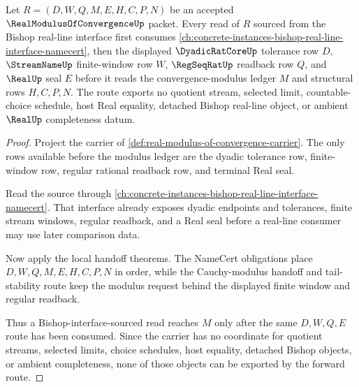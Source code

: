 \begin{theorem}
\label{thm:real-modulus-of-convergence-bishop-interface-forward-route}
Let $R=(D,W,Q,M,E,H,C,P,N)$ be an accepted $\RealModulusOfConvergenceUp$ packet. Every read of $R$ sourced from the Bishop real-line interface first consumes \autoref{ch:concrete-instances-bishop-real-line-interface-namecert}, then the displayed $\DyadicRatCoreUp$ tolerance row $D$, $\StreamNameUp$ finite-window row $W$, $\RegSeqRatUp$ readback row $Q$, and $\RealUp$ seal $E$ before it reads the convergence-modulus ledger $M$ and structural rows $H,C,P,N$. The route exports no quotient stream, selected limit, countable-choice schedule, host Real equality, detached Bishop real-line object, or ambient $\RealUp$ completeness datum.
\end{theorem}
\begin{proof}
Project the carrier of \autoref{def:real-modulus-of-convergence-carrier}. The only rows available before the modulus ledger are the dyadic tolerance row, finite-window row, regular rational readback row, and terminal Real seal.

Read the source through \autoref{ch:concrete-instances-bishop-real-line-interface-namecert}. That interface already exposes dyadic endpoints and tolerances, finite stream windows, regular readback, and a Real seal before a real-line consumer may use later comparison data.

Now apply the local handoff theorems. The NameCert obligations place $D,W,Q,M,E,H,C,P,N$ in order, while the Cauchy-modulus handoff and tail-stability route keep the modulus request behind the displayed finite window and regular readback.

Thus a Bishop-interface-sourced read reaches $M$ only after the same $D,W,Q,E$ route has been consumed. Since the carrier has no coordinate for quotient streams, selected limits, choice schedules, host equality, detached Bishop objects, or ambient completeness, none of those objects can be exported by the forward route.
\end{proof}

